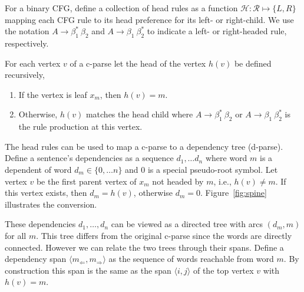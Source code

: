 \documentclass[11pt,letterpaper]{article}
\newcommand{\rules}{\mathcal{R}}
\newcommand{\Left}[1]{#1_{\Leftarrow}}
\newcommand{\Right}[1]{#1_{\Rightarrow}}
\newcommand{\Span}[1]{\langle #1 \rangle}
\newcommand{\RuleA}[3]{#1 \rightarrow #2^*\ #3}
\newcommand{\RuleB}[3]{#1 \rightarrow #2\ #3^*}
\begin{document}
For a binary CFG, define a collection of head rules as a function $\mathcal{H} : \rules \mapsto \{L, R\}$ 
mapping each CFG rule to its head preference for its left- or right-child. We use the notation 
$\RuleA{A}{\beta_1}{\beta_2}$ and $\RuleB{A}{\beta_1}{\beta_2}$ to indicate a left-
or right-headed rule, respectively. 

For each vertex $v$ of a c-parse let the head of the vertex $h(v)$ be defined recursively,
 
 \begin{enumerate}
  \item  If the vertex is leaf $x_m$, then $h(v)=m$.
  \item Otherwise,  $h(v)$ matches the head child where $\RuleA{A}{\beta_1}{\beta_2}$ or $\RuleB{A}{\beta_1}{\beta_2}$  is the rule production at this vertex.
  \end{enumerate}

The head rules can be used to map a c-parse to a dependency tree (d-parse).
Define a sentence's dependencies as a sequence $d_1, \ldots d_n$ 
where word $m$ is a dependent of word $d_m \in \{0, \ldots n\}$ and $0$ is 
a special pseudo-root symbol. Let vertex $v$ be the first 
parent vertex of $x_m$ not headed by $m$, i.e., $h(v) \neq m$. 
If this vertex exists, then $d_m = h(v)$, otherwise $d_m = 0$.  
Figure~\ref{fig:spine} illustrates the conversion.





These dependencies $d_1, \ldots, d_n$ can be viewed as a directed tree with arcs
$(d_m, m)$ for all $m$. This tree differs from the original c-parse
since the words are directly connected. However we can relate the two
trees through their spans. Define a dependency span $\Span{\Left{m},
  \Right{m}}$ as the sequence of words reachable from word $m$. By
construction this span is the same as the span $\Span{i, j}$
of the top vertex $v$ with $h(v) = m$.
\end{document}
